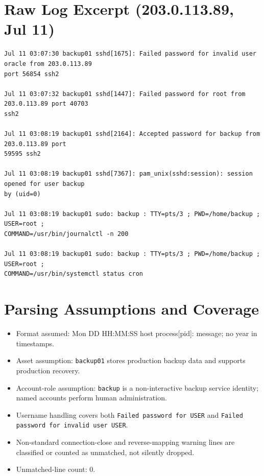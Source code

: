\section{Raw Log Excerpt (203.0.113.89, Jul 11)}
\label{app:raw-excerpt}
\setcounter{table}{0}
\setcounter{figure}{0}
\footnotesize
\begin{verbatim}
Jul 11 03:07:30 backup01 sshd[1675]: Failed password for invalid user oracle from 203.0.113.89
port 56854 ssh2

Jul 11 03:07:32 backup01 sshd[1447]: Failed password for root from 203.0.113.89 port 40703
ssh2

Jul 11 03:08:19 backup01 sshd[2164]: Accepted password for backup from 203.0.113.89 port
59595 ssh2

Jul 11 03:08:19 backup01 sshd[7367]: pam_unix(sshd:session): session opened for user backup
by (uid=0)

Jul 11 03:08:19 backup01 sudo: backup : TTY=pts/3 ; PWD=/home/backup ; USER=root ;
COMMAND=/usr/bin/journalctl -n 200

Jul 11 03:08:19 backup01 sudo: backup : TTY=pts/3 ; PWD=/home/backup ; USER=root ;
COMMAND=/usr/bin/systemctl status cron
\end{verbatim}
\normalsize

\section{Parsing Assumptions and Coverage}
\label{app:parsing-coverage}
\setcounter{table}{0}
\setcounter{figure}{0}
\begin{itemize}
    \item Format assumed: Mon DD HH:MM:SS host process[pid]: message; no year in timestamps.
    \item Asset assumption: \texttt{backup01} stores production backup data and supports production recovery.
    \item Account-role assumption: \texttt{backup} is a non-interactive backup service identity; named accounts perform human administration.
    \item Username handling covers both \texttt{Failed password for USER} and \texttt{Failed password for invalid user USER}.
    \item Non-standard connection-close and reverse-mapping warning lines are classified or counted as unmatched, not silently dropped.
    \item Unmatched-line count: 0.
\end{itemize}

